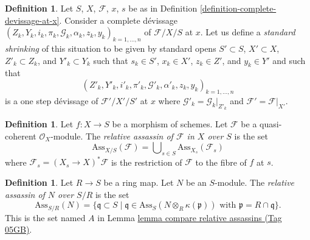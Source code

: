 \documentclass{amsart}
\theoremstyle{plain}
\theoremstyle{definition}
\newtheorem{definition}[subsection]{Definition}
\theoremstyle{remark}
\numberwithin{equation}{subsection}
\begin{document}
\begin{definition}
\label{definition-shrink-complete}
Let $S$, $X$, $\mathcal{F}$, $x$, $s$ be as in
Definition \ref{definition-complete-devissage-at-x}.
Consider a complete d\'evissage
$(Z_k, Y_k, i_k, \pi_k, \mathcal{G}_k, \alpha_k, z_k, y_k)_{k = 1, \ldots, n}$
of $\mathcal{F}/X/S$ at $x$. Let us define a
{\it standard shrinking} of this situation to be
given by standard opens $S' \subset S$, $X' \subset X$,
$Z'_k \subset Z_k$, and $Y'_k \subset Y_k$ such that $s_k \in S'$,
$x_k \in X'$, $z_k \in Z'$, and $y_k \in Y'$ and such that
$$
(Z'_k, Y'_k, i'_k, \pi'_k,
\mathcal{G}'_k, \alpha'_k, z_k, y_k)_{k = 1, \ldots, n}
$$
is a one step d\'evissage of $\mathcal{F}'/X'/S'$ at $x$ where
$\mathcal{G}'_k = \mathcal{G}_k|_{Z'_k}$ and
$\mathcal{F}' = \mathcal{F}|_{X'}$.
\end{definition}

\begin{definition}
\label{divisors-definition-relative-assassin}
Let $f : X \to S$ be a morphism of schemes.
Let $\mathcal{F}$ be a quasi-coherent $\mathcal{O}_X$-module.
The {\it relative assassin of $\mathcal{F}$ in $X$ over $S$}
is the set
$$
\text{Ass}_{X/S}(\mathcal{F}) =
\bigcup\nolimits_{s \in S} \text{Ass}_{X_s}(\mathcal{F}_s)
$$
where $\mathcal{F}_s = (X_s \to X)^*\mathcal{F}$ is the restriction
of $\mathcal{F}$ to the fibre of $f$ at $s$.
\end{definition}

\begin{definition}
\label{algebra-definition-relative-assassin}
Let $R \to S$ be a ring map. Let $N$ be an $S$-module.
The {\it relative assassin of $N$ over $S/R$} is the set
$$
\text{Ass}_{S/R}(N)
=
\{ \mathfrak q \subset S \mid
\mathfrak q \in \text{Ass}_S(N \otimes_R \kappa(\mathfrak p))
\text{ with }\mathfrak p = R \cap \mathfrak q\}.
$$
This is the set named $A$ in
Lemma \href{https://stacks.math.columbia.edu/tag/05GB}{lemma compare relative assassins (Tag 05GB)}.
\end{definition}
\end{document}
